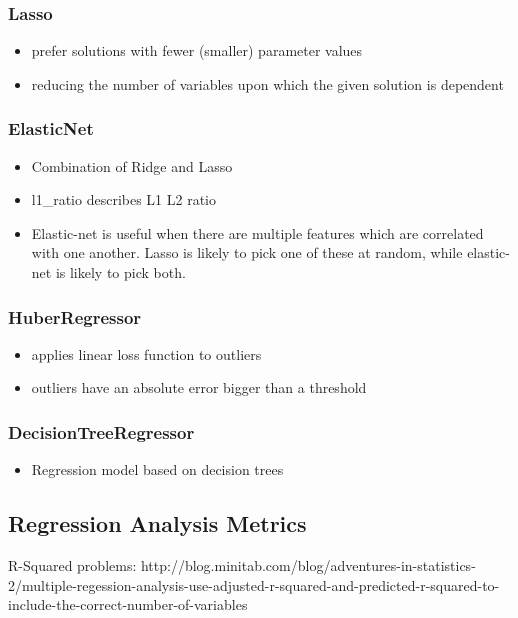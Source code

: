 \subsubsection{Lasso}
\begin{itemize}
	\item prefer solutions with fewer (smaller) parameter values
	\item reducing the number of variables upon which the given solution is dependent
\end{itemize}
\subsubsection{ElasticNet}
\begin{itemize}
	\item Combination of Ridge and Lasso
	\item l1\_ratio describes L1 L2 ratio
	\item Elastic-net is useful when there are multiple features which are correlated with one another. Lasso is likely to pick one of these at random, while elastic-net is likely to pick both.
\end{itemize}
\subsubsection{HuberRegressor}
\begin{itemize}
	\item applies linear loss function to outliers
	\item outliers have an absolute error bigger than a threshold
\end{itemize}
\subsubsection{DecisionTreeRegressor}
\begin{itemize}
	\item Regression model based on decision trees
\end{itemize}


\subsection{Regression Analysis Metrics}




R-Squared problems: http://blog.minitab.com/blog/adventures-in-statistics-2/multiple-regession-analysis-use-adjusted-r-squared-and-predicted-r-squared-to-include-the-correct-number-of-variables

